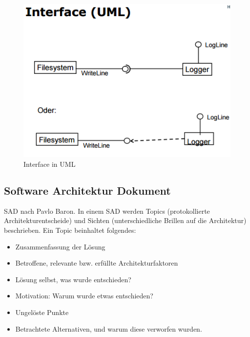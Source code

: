 \begin{figure}[h!]
\centering
\includegraphics[width=0.7\linewidth]{fig/interface-uml}
\caption{Interface in UML}
\label{fig:interface-uml}
\end{figure}

\subsection{Software Architektur Dokument}
SAD nach Pavlo Baron. In einem SAD werden Topics (protokollierte Architekturentscheide) und Sichten (unterschiedliche Brillen auf die Architektur) beschrieben. 
Ein Topic beinhaltet folgendes:

\begin{itemize}
	\item Zusammenfassung der Lösung
	\item Betroffene, relevante bzw. erfüllte Architekturfaktoren
	\item Lösung selbst, was wurde entschieden?
	\item Motivation: Warum wurde etwas entschieden?
	\item Ungelöste Punkte
	\item Betrachtete Alternativen, und warum diese verworfen wurden.
\end{itemize}
